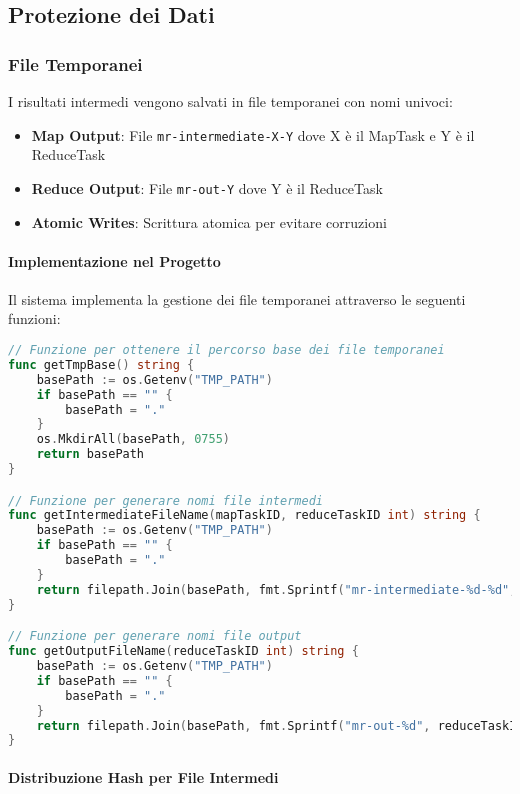 \documentclass[12pt,a4paper]{article}
\begin{document}
\subsection{Protezione dei Dati}

\subsubsection{File Temporanei}

I risultati intermedi vengono salvati in file temporanei con nomi univoci:

\begin{itemize}
\item \textbf{Map Output}: File \texttt{mr-intermediate-X-Y} dove X è il MapTask e Y è il ReduceTask
\item \textbf{Reduce Output}: File \texttt{mr-out-Y} dove Y è il ReduceTask
\item \textbf{Atomic Writes}: Scrittura atomica per evitare corruzioni
\end{itemize}

\paragraph{Implementazione nel Progetto}

Il sistema implementa la gestione dei file temporanei attraverso le seguenti funzioni:

\begin{lstlisting}[language=Go, caption=Funzioni per la gestione dei file temporanei]
// Funzione per ottenere il percorso base dei file temporanei
func getTmpBase() string {
    basePath := os.Getenv("TMP_PATH")
    if basePath == "" {
        basePath = "."
    }
    os.MkdirAll(basePath, 0755)
    return basePath
}

// Funzione per generare nomi file intermedi
func getIntermediateFileName(mapTaskID, reduceTaskID int) string {
    basePath := os.Getenv("TMP_PATH")
    if basePath == "" {
        basePath = "."
    }
    return filepath.Join(basePath, fmt.Sprintf("mr-intermediate-%d-%d", mapTaskID, reduceTaskID))
}

// Funzione per generare nomi file output
func getOutputFileName(reduceTaskID int) string {
    basePath := os.Getenv("TMP_PATH")
    if basePath == "" {
        basePath = "."
    }
    return filepath.Join(basePath, fmt.Sprintf("mr-out-%d", reduceTaskID))
}
\end{lstlisting}

\paragraph{Distribuzione Hash per File Intermedi}
\end{document}
